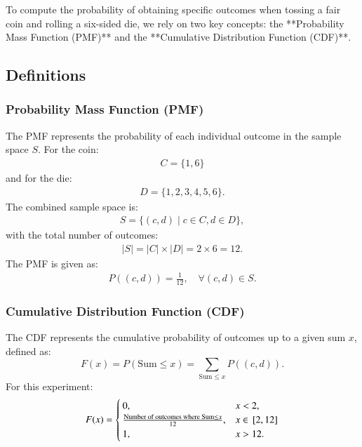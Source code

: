\documentclass[journal]{IEEEtran}
\begin{document}
To compute the probability of obtaining specific outcomes when tossing a fair coin and rolling a six-sided die, we rely on two key concepts: the **Probability Mass Function (PMF)** and the **Cumulative Distribution Function (CDF)**.

\subsection*{Definitions}
\subsubsection*{Probability Mass Function (PMF)}
The PMF represents the probability of each individual outcome in the sample space $S$. For the coin:
\begin{align}
    C = \{1, 6\}
\end{align}
and for the die:
\begin{align}
    D = \{1, 2, 3, 4, 5, 6\}.
\end{align}
The combined sample space is:
\begin{align}
    S = \{(c, d) \mid c \in C, d \in D\},
\end{align}
with the total number of outcomes:
\begin{align}
    |S| = |C| \times |D| = 2 \times 6 = 12.
\end{align}
The PMF is given as:
\begin{align}
    P((c, d)) = \frac{1}{12}, \quad \forall (c, d) \in S.
\end{align}

\subsubsection*{Cumulative Distribution Function (CDF)}
The CDF represents the cumulative probability of outcomes up to a given sum $x$, defined as:
\[
F(x) = P(\text{Sum} \leq x) = \sum_{\text{Sum} \leq x} P((c, d)).
\]
For this experiment:
\[
F(x) = 
\begin{cases} 
0, & x < 2, \\
\frac{\text{Number of outcomes where Sum} \leq x}{12}, & x \in {}\left[2,12\right] \\
1, & x > 12.
\end{cases}
\]
\end{document}
